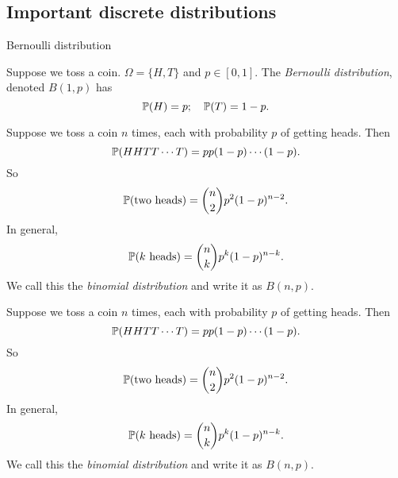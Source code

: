 \subsection{Important discrete distributions}

%
\begin{note}
  \begin{field}
    Bernoulli distribution
  \end{field}
  \begin{field}
    \begin{defi}
      Suppose we toss a coin. $\Omega=\{H, T\}$ and $p\in [0, 1]$. The \emph{Bernoulli distribution}, denoted $B(1, p)$ has
      \[
        \P(H) = p;\quad \P(T) = 1- p.
      \]
    \end{defi}
  \end{field}
  \xplain{}%
\end{note}

\begin{note}
  \begin{field}
    \begin{defi}
      Suppose we toss a coin $n$ times, each with probability $p$ of getting heads. Then
      \[
        \P(HHTT\cdots T) = pp(1 - p)\cdots (1 - p).
      \]
      So
      \[
        \P(\text{two heads}) = \binom{n}{2}p^2(1 - p)^{n -2}.
      \]
      In general,
      \[
        \P(k\text{ heads}) = \binom{n}{k}p^k(1 - p)^{n - k}.
      \]
      We call this the \emph{binomial distribution} and write it as $B(n, p)$.
    \end{defi}
  \end{field}
  \begin{field}
    \begin{defi}
      Suppose we toss a coin $n$ times, each with probability $p$ of getting heads. Then
      \[
        \P(HHTT\cdots T) = pp(1 - p)\cdots (1 - p).
      \]
      So
      \[
        \P(\text{two heads}) = \binom{n}{2}p^2(1 - p)^{n -2}.
      \]
      In general,
      \[
        \P(k\text{ heads}) = \binom{n}{k}p^k(1 - p)^{n - k}.
      \]
      We call this the \emph{binomial distribution} and write it as $B(n, p)$.
    \end{defi}
  \end{field}
  \xplain{}%
\end{note}

